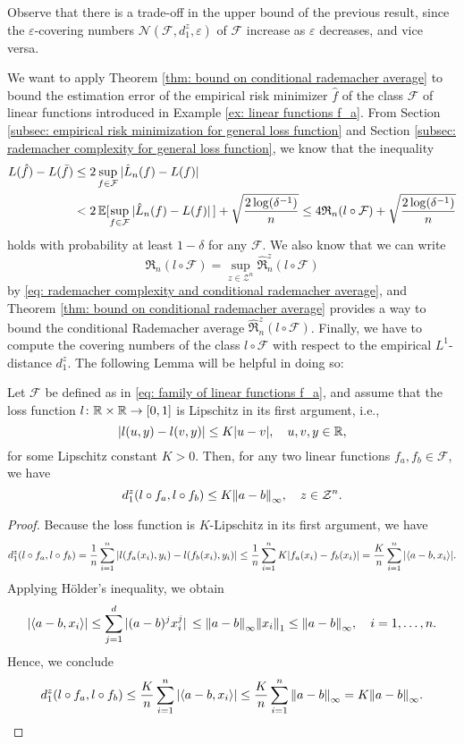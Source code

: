 Observe that there is a trade-off in the upper bound of the previous result, since the $\varepsilon$-covering numbers $\mathcal{N}(\mathcal{F}, d_1^z, \varepsilon)$ of $\mathcal{F}$ increase as $\varepsilon$ decreases, and vice versa. 

We want to apply Theorem \ref{thm: bound on conditional rademacher average} to bound the estimation error of the empirical risk minimizer $\hat{f}$ of the class $\mathcal{F}$ of linear functions introduced in Example \ref{ex: linear functions f_a}. From Section \ref{subsec: empirical risk minimization for general loss function} and Section \ref{subsec: rademacher complexity for general loss function}, we know that the inequality
\begin{align*}
    L(\hat{f}) - L(\bar{f}) &\leq 2 \sup_{f \in \mathcal{F}} \abs*{\hat{L}_n(f) - L(f)} \\
    &< 2 \operatorname{\mathbb{E}}[\sup_{f \in \mathcal{F}} \abs*{\hat L_n(f) - L(f)}] + \sqrt{\frac{2 \log(\delta^{-1})}{n}} \leq 4 \mathfrak{R}_n(l \circ \mathcal{F}) + \sqrt{\frac{2 \log(\delta^{-1})}{n}}
\end{align*}
holds with probability at least $1 - \delta$ for any $\mathcal{F}$. We also know that we can write
\[
    \mathfrak{R}_n(l \circ \mathcal{F}) = \sup_{z \in \mathcal{Z}^n} \hat{\mathfrak{R}}_n^z(l \circ \mathcal{F})
\]
by \eqref{eq: rademacher complexity and conditional rademacher average}, and Theorem \ref{thm: bound on conditional rademacher average} provides a way to bound the conditional Rademacher average $\hat{\mathfrak{R}}_n^z(l \circ \mathcal{F})$. Finally, we have to compute the covering numbers of the class $l \circ \mathcal{F}$ with respect to the empirical $L^1$-distance $d_1^z$. The following Lemma will be helpful in doing so:

\begin{lemma}
\label{lem: distance between linear functions f_a}
Let $\mathcal{F}$ be defined as in \eqref{eq: family of linear functions f_a}, and assume that the loss function $l \colon \mathbb{R} \times \mathbb{R} \to [0, 1]$ is Lipschitz in its first argument, i.e.,
\[
    \abs{l(u, y) - l(v, y)} \leq K \abs{u - v}, \quad u, v, y \in \mathbb{R},
\]
for some Lipschitz constant $K > 0$. Then, for any two linear functions $f_a, f_b \in \mathcal{F}$, we have
\[
    d_1^z(l \circ f_a, l \circ f_b) \leq K \norm{a - b}_{\infty}, \quad z \in \mathcal{Z}^n.
\]
\end{lemma}

\begin{proof}
Because the loss function is $K$-Lipschitz in its first argument, we have
\[
    d_1^z(l \circ f_a, l \circ f_b) = \frac{1}{n} \sum_{i=1}^n \abs{l(f_a(x_i), y_i) - l(f_b(x_i), y_i)} \leq \frac{1}{n} \sum_{i=1}^n K \abs{f_a(x_i) - f_b(x_i)} = \frac{K}{n} \sum_{i=1}^n \abs{\langle a - b, x_i \rangle}.
\]
Applying H{\"o}lder's inequality, we obtain
\[
    \abs{\langle a - b, x_i \rangle} \leq \sum_{j=1}^d \abs*{(a - b)^j x_i^j} \leq \norm{a - b}_{\infty} \norm{x_i}_1 \leq \norm{a - b}_{\infty}, \quad i = 1, \dots, n.
\]
Hence, we conclude
\[
    d_1^z(l \circ f_a, l \circ f_b) \leq \frac{K}{n} \sum_{i=1}^n \abs{\langle a - b, x_i \rangle} \leq \frac{K}{n} \sum_{i=1}^n \norm{a - b}_{\infty} = K \norm{a - b}_{\infty}. \qedhere
\]
\end{proof}

